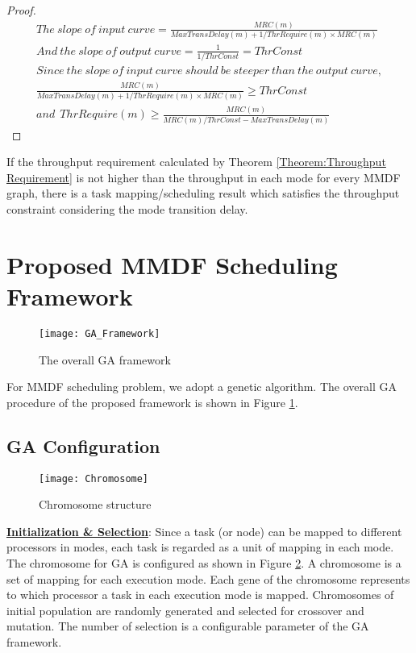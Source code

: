 \documentclass[prodmode,acmtecs]{acmsmall}
\begin{document}
\begin{proof}
\begin{gather*}
The \: slope \: of \: input \: curve = \frac{MRC(m)}{MaxTransDelay(m) + 1/ThrRequire(m) \times MRC(m)} \\
And \: the \: slope \: of \: output \: curve = \frac{1}{1/ThrConst} = ThrConst \\
Since \: the \: slope \: of \: input \: curve \: should \: be \: steeper \: than \: the \: output \: curve, \\
\frac{MRC(m)}{MaxTransDelay(m) + 1/ThrRequire(m) \times MRC(m)} \geq ThrConst \\
and \:\: ThrRequire(m) \geq \frac{MRC(m)}{MRC(m)/ThrConst - MaxTransDelay(m)}
\end{gather*}
\end{proof}

If the throughput requirement calculated by Theorem \ref{Theorem:Throughput Requirement} is not higher than the throughput in each mode for every MMDF graph, there is a task mapping/scheduling result which satisfies the throughput constraint considering the mode transition delay.


\section{Proposed MMDF Scheduling Framework}
\label{Section:Proposed MMDF Scheduling Framework}

\begin{figure} [ht]
\centerline{\texttt{[image: GA\_Framework]}}
\caption{The overall GA framework}
\label{Figure:GA Framework}
\end{figure}

For MMDF scheduling problem, we adopt a genetic algorithm. The overall GA procedure of the proposed framework is shown in Figure \ref{Figure:GA Framework}.

\subsection{GA Configuration}
\label{SubSection:GA Configuration}

\begin{figure} [ht]
\centerline{\texttt{[image: Chromosome]}}
\caption{Chromosome structure}
\label{Figure:Chromosome}
\end{figure}

\textbf{\underline{Initialization \& Selection}}: Since a task (or node) can be mapped to different processors in modes, each task is regarded as a unit of mapping in each mode. The chromosome for GA is configured as shown in Figure \ref{Figure:Chromosome}. A chromosome is a set of mapping for each execution mode. Each gene of the chromosome represents to which processor a task in each execution mode is mapped. Chromosomes of initial population are randomly generated and selected for crossover and mutation. The number of selection is a configurable parameter of the GA framework.
\end{document}
